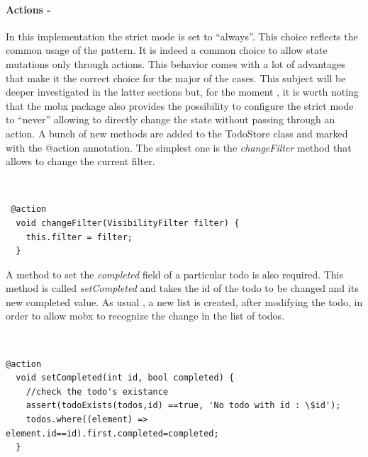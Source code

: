 \paragraph{Actions - }
\label{subpar:todo_app_bloc_core_state}In this implementation the strict mode is set to “always”. This choice reflects the common usage of the pattern. It is indeed a common choice to allow state mutations only through actions. This behavior comes with a lot of advantages that make it the correct choice for the major of the cases. This subject will be deeper investigated in the latter sections but, for the moment , it is worth noting that the mobx package also provides the possibility to configure the strict mode to “never”  allowing to directly change the state without passing through an action.  A bunch of new methods are added to the TodoStore class and marked with the @action annotation. The simplest one is the \textit{changeFilter} method that allows to change the current filter.
\begin{code}
\mbox{}\\
 \mbox{}
		\label{code:2.14}
\begin{verbatim} 
 @action
  void changeFilter(VisibilityFilter filter) {
    this.filter = filter;
  }
\end{verbatim}
\mbox{}
\end{code}

A method to set the \textit{completed} field of a particular todo is also required. This method is called \textit{setCompleted} and takes the id of the todo to be changed and its new completed value. As usual , a new list is created, after modifying the todo, in order to allow mobx to recognize the change in the list of todos.
\begin{code}
\mbox{}\\
 \mbox{}
		\label{code:2.14}
\begin{verbatim}
@action
  void setCompleted(int id, bool completed) {
    //check the todo's existance
    assert(todoExists(todos,id) ==true, 'No todo with id : \$id');
    todos.where((element) => element.id==id).first.completed=completed;
  }

\end{verbatim}
\mbox{}
\end{code}

